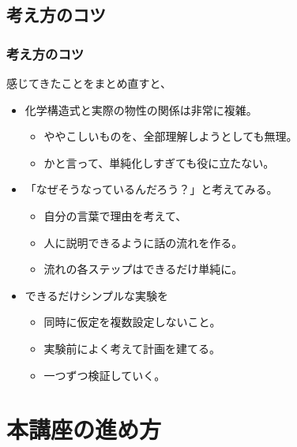 \documentclass[unicode,12pt]{beamer}%
\begin{document}
\subsection{考え方のコツ}
\begin{frame}
	\frametitle{考え方のコツ}
		\begin{block}{感じてきたことをまとめ直すと、}
			\begin{itemize}
				\item 化学構造式と実際の物性の関係は非常に複雑。
				\begin{itemize}
					\item ややこしいものを、全部理解しようとしても無理。
					\item かと言って、単純化しすぎても役に立たない。
				\end{itemize}
				\item 「なぜそうなっているんだろう？」と考えてみる。
				\begin{itemize}
					\item 自分の言葉で理由を考えて、
					\item 人に説明できるように話の流れを作る。
					\item 流れの各ステップはできるだけ単純に。
				\end{itemize}
				\item できるだけシンプルな実験を
				\begin{itemize}
					\item 同時に仮定を複数設定しないこと。
					\item 実験前によく考えて計画を建てる。
					\item 一つずつ検証していく。
				\end{itemize}
			\end{itemize}
		\end{block}
\end{frame}

\section{本講座の進め方}
\end{document}
